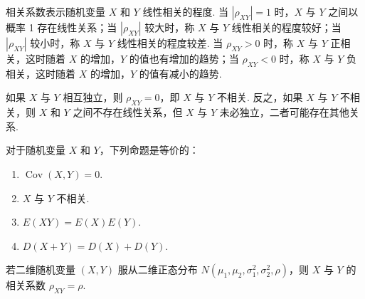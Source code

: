 相关系数表示随机变量 $X$ 和 $Y$ 线性相关的程度. 当 $|\rho_{XY}|=1$ 时，$X$ 与 $Y$ 之间以概率 1 存在线性关系；当 $|\rho_{XY}|$ 较大时，称 $X$ 与 $Y$ 线性相关的程度较好；当 $|\rho_{XY}|$ 较小时，称 $X$ 与 $Y$ 线性相关的程度较差. 当 $\rho_{XY} > 0$ 时，称 $X$ 与 $Y$ 正相关，这时随着 $X$ 的增加，$Y$ 的值也有增加的趋势；当 $\rho_{XY} < 0$ 时，称 $X$ 与 $Y$ 负相关，这时随着 $X$ 的增加，$Y$ 的值有减小的趋势.

如果 $X$ 与 $Y$ 相互独立，则 $\rho_{XY} = 0$，即 $X$ 与 $Y$ 不相关. 反之，如果 $X$ 与 $Y$ 不相关，则 $X$ 和 $Y$ 之间不存在线性关系，但 $X$ 与 $Y$ 未必独立，二者可能存在其他关系.

对于随机变量 $X$ 和 $Y$，下列命题是等价的：
\begin{enumerate}
    \item $\operatorname{Cov}(X,Y) = 0$.
    \item $X$ 与 $Y$ 不相关.
    \item $E(XY) = E(X) E(Y)$.
    \item $D(X+Y) = D(X) + D(Y)$.
\end{enumerate}

\begin{conclusion}
    若二维随机变量 $(X,Y)$ 服从二维正态分布 $N(\mu_1,\mu_2,\sigma_1^2,\sigma_2^2,\rho)$，则 $X$ 与 $Y$ 的相关系数 $\rho_{XY} = \rho$.
\end{conclusion}

